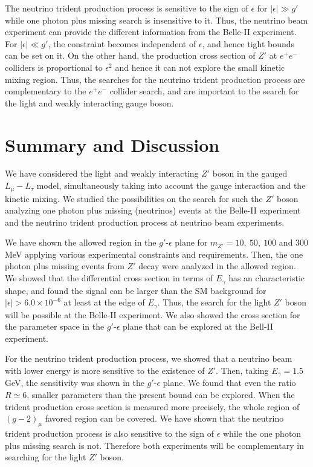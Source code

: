 \documentclass[preprint,amsmath,amssymb,superscriptaddress,nofootinbib]{revtex4}
\begin{document}
The neutrino trident production process is sensitive to the sign of $\epsilon$ for $|\epsilon| \gg g'$ while one photon 
plus missing search is insensitive to it. 
Thus, the neutrino beam experiment can provide the different information from the Belle-II experiment. 
For $|\epsilon| \ll g'$, the constraint becomes independent  of $\epsilon$, and hence tight bounds can be set on it.
On the other hand, the production cross section of $Z'$ at $e^+ e^-$ colliders is proportional to $\epsilon^2$ and 
hence it can not explore the small kinetic mixing region. Thus, the searches for the neutrino trident production process 
are complementary to the $e^+ e^-$ collider search, and are important to the search for the light and weakly interacting gauge 
boson.






\section{Summary and Discussion} \label{sec:summary}
We have considered the light and weakly interacting $Z'$ boson in the gauged $L_\mu - L_\tau$ model, 
simultaneously taking into account the gauge interaction and the kinetic mixing. 
We studied the possibilities on the search for such the $Z'$ boson analyzing one photon plus 
missing (neutrinos) events  at the Belle-II experiment 
and the neutrino trident production process at neutrino beam experiments. 

We have shown the allowed region in the $g'$-$\epsilon$ plane for $m_{Z'} = 10,~50,~100$ and $300$ MeV applying 
various experimental constraints and requirements. Then, the one photon plus missing events from $Z'$ decay were analyzed in the 
allowed region. We showed that the differential cross section in terms of $E_\gamma$ has an characteristic shape, and 
found the signal can be larger than the SM background for $|\epsilon| > 6.0 \times 10^{-6}$ at least at the edge of $E_\gamma$. 
Thus, the search for the light $Z'$ boson will be possible at the Belle-II experiment.
We also showed the cross section for the parameter space in the $g'$-$\epsilon$ plane that can be explored at the Bell-II experiment.

For the neutrino trident production process, we showed that a neutrino beam with lower energy is more sensitive to the existence of  $Z'$. 
Then, taking $E_\gamma = 1.5$ GeV, the sensitivity was shown in the $g'$-$\epsilon$ plane. 
We found that even the ratio $R \simeq 6$,  smaller parameters than the present bound can be explored. 
When the trident production cross section is measured more precisely, the whole region of 
$(g-2)_\mu$ favored region can be covered. We have shown that the neutrino trident production process is also sensitive 
to the sign of $\epsilon$ while the one photon plus missing search is not. Therefore both experiments will be complementary 
in searching for the light $Z'$ boson.
\end{document}
